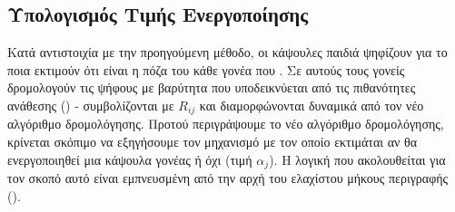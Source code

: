 \subsection{Υπολογισμός Τιμής Ενεργοποίησης}

Κατά αντιστοιχία με την προηγούμενη μέθοδο, οι κάψουλες παιδιά ψηφίζουν για το ποια εκτιμούν ότι είναι η πόζα του κάθε γονέα που . Σε αυτούς τους γονείς δρομολογούν τις ψήφους με βαρύτητα που υποδεικνύεται από τις πιθανότητες ανάθεσης () - συμβολίζονται με $R_{ij}$ και διαμορφώνονται δυναμικά από τον νέο αλγόριθμο δρομολόγησης. Προτού περιγράψουμε το νέο αλγόριθμο δρομολόγησης, κρίνεται σκόπιμο να εξηγήσουμε τον μηχανισμό με τον οποίο εκτιμάται αν θα ενεργοποιηθεί μια κάψουλα γονέας ή όχι (τιμή $\alpha_j$). Η λογική που ακολουθείται για τον σκοπό αυτό είναι εμπνευσμένη από την αρχή του ελαχίστου μήκους περιγραφής ().\par

